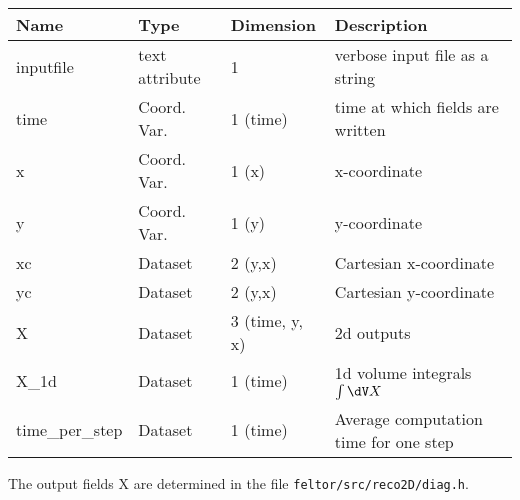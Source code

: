 \begin{longtable}{lll>{\RaggedRight}p{7cm}}
\toprule
\rowcolor{gray!50}\textbf{Name} &  \textbf{Type} & \textbf{Dimension} & \textbf{Description}  \\ \midrule
inputfile        & text attribute & 1 & verbose input file as a string \\
time             & Coord. Var. & 1 (time) & time at which fields are written \\
x                & Coord. Var. & 1 (x) & x-coordinate  \\
y                & Coord. Var. & 1 (y) & y-coordinate \\
xc               & Dataset & 2 (y,x) & Cartesian x-coordinate  \\
yc               & Dataset & 2 (y,x) & Cartesian y-coordinate \\
X                & Dataset & 3 (time, y, x) & 2d outputs \\
X\_1d            & Dataset & 1 (time) & 1d volume integrals $\int \dV X$ \\
time\_per\_step  & Dataset & 1 (time) & Average computation time for one step \\
\bottomrule
\end{longtable}
The output fields X are determined in the file \texttt{feltor/src/reco2D/diag.h}.

